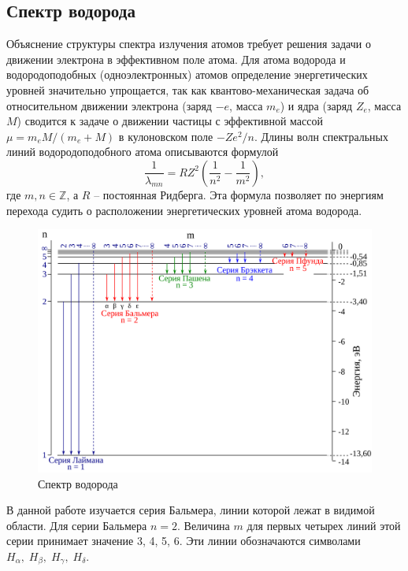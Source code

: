 \documentclass[a4paper, 12pt]{article}
\begin{document}
\subsection*{Спектр водорода}
Объяснение структуры спектра излучения атомов требует решения задачи о движении электрона в 
эффективном поле атома.	Для атома водорода и водородоподобных (одноэлектронных) атомов 	
определение энергетических уровней значительно упрощается, так как	квантово-механическая 
задача об относительном движении электрона (заряд $ -e $, масса $ m_e $) и ядра (заряд $ Z_e $, масса $ M $) 
сводится к задаче о движении частицы с эффективной массой $ \mu = m_e M /(m_e+M) $ в кулоновском поле $ - Z e^2 / n $. Длины волн 
спектральных линий водородоподобного атома описываются формулой
	\begin{equation}
		\dfrac{1}{\lambda_{m n}} = R Z^2 (\dfrac{1}{n^2}-\dfrac{1}{m^2}),
	\end{equation}
где $m,n \in \mathbb{Z} $, а $ R $ -- постоянная Ридберга.
Эта формула позволяет по энергиям перехода судить о расположении энергетических уровней атома водорода.
\begin{figure}[H]
    \centering
    \includegraphics[width=1\textwidth]{Wasserstoff-Termschema-2-ru.svg.png}
    \caption{Спектр водорода}
    \label{fig:H}
\end{figure}
	В данной работе изучается серия Бальмера, линии которой лежат в видимой области. Для серии Бальмера $ n = 2 $. Величина $ m $ для первых четырех линий этой серии принимает значение 3, 4, 5, 6. Эти линии	обозначаются символами $ H_\alpha,\;H_\beta,\;H_\gamma,\;H_\delta $.
	
\end{document}

